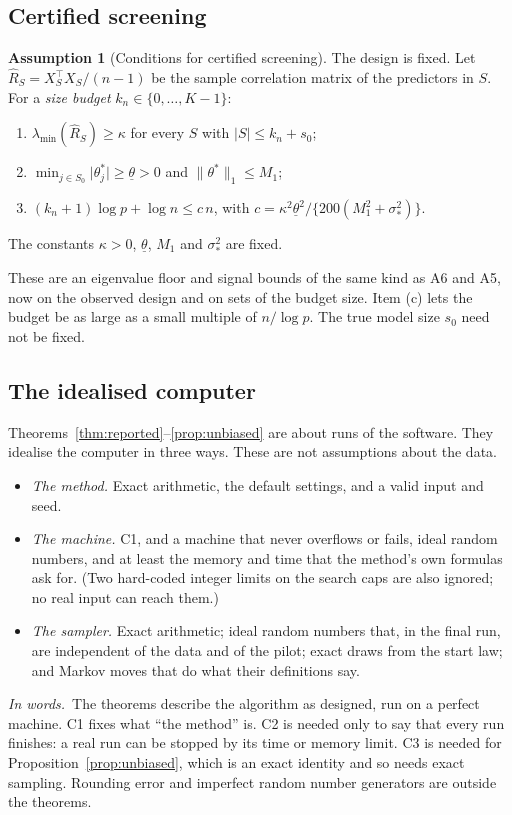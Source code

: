 \documentclass[11pt]{article}
\newcommand{\abs}[1]{\lvert #1\rvert}
\newcommand{\norm}[1]{\lVert #1\rVert}
\newcommand{\lmin}{\lambda_{\min}}
\newcommand{\tstar}{\theta^*}
\newcommand{\sigs}{\sigma_*}
\newcommand{\Sz}{S_0}
\newcommand{\sz}{s_0}
\theoremstyle{plain}
\theoremstyle{definition}
\newtheorem{asm}{Assumption}
\newcommand{\words}{\par\smallskip\noindent\textit{In words.}\ }
\begin{document}
\subsection*{Certified screening}

\begin{asm}[Conditions for certified screening]\label{a:scr}
The design is fixed. Let $\hat R_S=X_S^\top X_S/(n-1)$ be the sample correlation matrix of the predictors in $S$. For a
\emph{size budget} $k_n\in\{0,\dots,K-1\}$:
\begin{enumerate}[label=(\alph*)]
  \item $\lmin(\hat R_S)\ge\kappa$ for every $S$ with $\abs{S}\le k_n+\sz$;
  \item $\min_{j\in\Sz}\abs{\theta^*_j}\ge\underline\theta>0$ and $\norm{\tstar}_1\le M_1$;
  \item $(k_n+1)\log p+\log n\le c\,n$, with $c=\kappa^2\underline\theta^2/\{200(M_1^2+\sigs^2)\}$.
\end{enumerate}
The constants $\kappa>0$, $\underline\theta$, $M_1$ and $\sigs^2$ are fixed.
\end{asm}
\noindent These are an eigenvalue floor and signal bounds of the same kind as A6 and A5, now on the observed design and
on sets of the budget size. Item (c) lets the budget be as large as a small multiple of $n/\log p$. The true model size
$\sz$ need not be fixed.

\subsection*{The idealised computer}

Theorems~\ref{thm:reported}--\ref{prop:unbiased} are about runs of the software. They idealise the computer in three
ways. These are not assumptions about the data.
\begin{itemize}
  \item[\textbf{C1}] \emph{The method.} Exact arithmetic, the default settings, and a valid input and seed.
  \item[\textbf{C2}] \emph{The machine.} C1, and a machine that never overflows or fails, ideal random numbers, and at
    least the memory and time that the method's own formulas ask for. (Two hard-coded integer limits on the search caps
    are also ignored; no real input can reach them.)
  \item[\textbf{C3}] \emph{The sampler.} Exact arithmetic; ideal random numbers that, in the final run, are independent
    of the data and of the pilot; exact draws from the start law; and Markov moves that do what their definitions say.
\end{itemize}
\words The theorems describe the algorithm as designed, run on a perfect machine. C1 fixes what ``the method'' is. C2
is needed only to say that every run finishes: a real run can be stopped by its time or memory limit. C3 is needed for
Proposition~\ref{prop:unbiased}, which is an exact identity and so needs exact sampling. Rounding error and imperfect
random number generators are outside the theorems.
\end{document}
